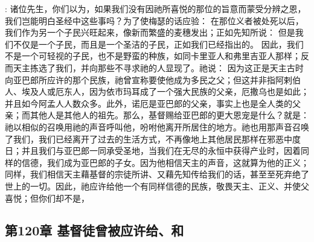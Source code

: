 : 诸位先生，你们以为，如果我们没有因祂所喜悦的那位的旨意而蒙受分辨之恩，我们岂能明白圣经中这些事吗？为了使梅瑟的话应验： 在那位义者被处死以后，我们作为另一个子民兴旺起来，像新而繁盛的麦穗发出；正如先知所说： 但是我们不仅是一个子民，而且是一个圣洁的子民，正如我们已经指出的。 因此，我们不是一个可轻视的子民，也不是野蛮的种族，如同卡里亚人和弗里吉亚人那样；反而天主拣选了我们，并向那些不寻求祂的人显现了。祂说： 因为这正是天主古时向亚巴郎所应许的那个民族，祂曾宣称要使他成为多民之父；但这并非指阿剌伯人、埃及人或厄东人，因为依市玛耳成了一个强大民族的父亲，厄撒乌也是如此；并且如今阿孟人人数众多。此外，诺厄是亚巴郎的父亲，事实上也是全人类的父亲；而其他人是其他人的祖先。那么，基督赐给亚巴郎的更大恩宠是什么？就是：祂以相似的召唤用祂的声音呼叫他，吩咐他离开所居住的地方。祂也用那声音召唤了我们，我们已经离开了过去的生活方式，不再像地上其他居民那样在邪恶中度日；并且我们与亚巴郎一同承受圣地，当我们在无尽的永恒中获得产业时，因着同样的信德，我们成为亚巴郎的子女。因为他相信天主的声音，这就算为他的正义；同样，我们相信天主藉基督的宗徒所讲、又藉先知传给我们的话，甚至至死弃绝了世上的一切。因此，祂应许给他一个有同样信德的民族，敬畏天主、正义、并使父喜悦；但你们却不是，\par


\subsection{第120章 基督徒曾被应许给、和}

